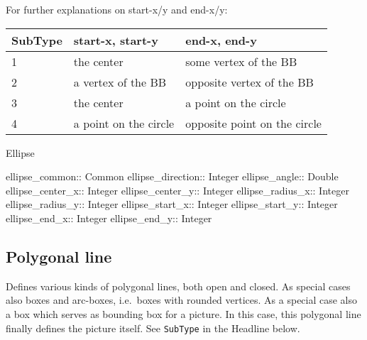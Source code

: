 \documentclass[10pt, a4paper]{article}
\begin{document}
\noindent
For further explanations on start-x/y and end-x/y: \\
%
\begin{tabular}{lll}
\toprule
SubType  & start-x, start-y  & end-x, end-y \\
\midrule
\midrule
1 & the center            & some vertex of the BB \\
2 & a vertex of the BB    & opposite vertex of the BB \\
3 & the center            & a point on the circle \\
4 & a point on the circle & opposite point on the circle \\
\bottomrule
\end{tabular}

Ellipse	 

ellipse\_common:: Common
ellipse\_direction:: Integer
ellipse\_angle:: Double
ellipse\_center\_x:: Integer
ellipse\_center\_y:: Integer
ellipse\_radius\_x:: Integer
ellipse\_radius\_y:: Integer
ellipse\_start\_x:: Integer
ellipse\_start\_y:: Integer
ellipse\_end\_x:: Integer
ellipse\_end\_y:: Integer

\subsection{Polygonal line}\label{subsec:polyline}

Defines various kinds of polygonal lines, both open and closed. 
As special cases also boxes and arc-boxes, i.e.~boxes with rounded vertices. 
As a special case also a box which serves as bounding box for a picture. 
In this case, this polygonal line finally defines the picture itself. 
See \texttt{SubType} in the Headline below. 
\end{document}
